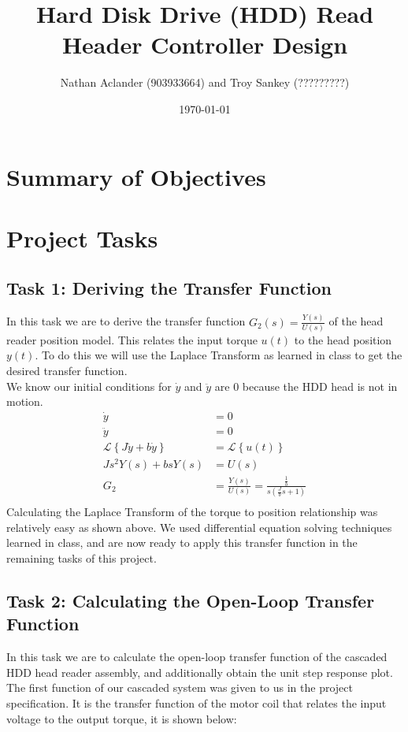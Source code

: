 \documentclass{article}
\title{Hard Disk Drive (HDD) Read Header Controller Design}
\date{\today}
\author{Nathan Aclander (903933664) and Troy Sankey (?????????)}
\begin{document}
\maketitle
\newpage

\section*{Summary of Objectives}

\section*{Project Tasks}
\subsection*{Task 1: Deriving the Transfer Function} In this task we are to derive the transfer function $G_2(s) =
	\frac{Y(s)}{U(s)}$ of the head reader position model. This relates the
	input torque $u(t)$ to the head position $y(t)$. To do this we will use
	the Laplace Transform as learned in class to get the desired transfer 
	function. \\
	We know our initial conditions for $\dot{y}$ and $\ddot{y}$ are $0$ because
	the HDD head is not in motion.
	\begin{align*}
		\dot{y} &= 0 \\
		\ddot{y} &= 0 \\
		\mathcal{L}\left\{ J\ddot{y} + b \dot{y}\right\} &= \mathcal{L}\left\{
		u(t)\right\} \\
		Js^2 Y(s) + bsY(s) &= U(s) \\
		G_2 &= \frac{Y(s)}{U(s)} = \frac{\frac{1}{b}}{s(\frac{J}{b}s + 1)}  \\
	\end{align*}
	Calculating the Laplace Transform of the torque to position relationship
	was relatively easy as shown above. We used differential equation solving
	techniques learned in class, and are now ready to apply this transfer
	function in the remaining tasks of this project.

\subsection*{Task 2: Calculating the Open-Loop Transfer Function}
	In this task we are to calculate the open-loop transfer function of the 
	cascaded HDD head reader assembly, and additionally obtain the unit step
	response plot. 
	The first function of our cascaded system was given to us in the project
	specification. It is the transfer function of the motor coil that relates
	the input voltage to the output torque, it is shown below: \\
\end{document}
